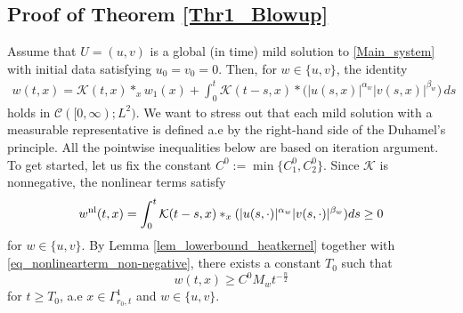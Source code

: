 \documentclass[11pt,reqno]{amsart}
\begin{document}
	\subsection{Proof of Theorem \ref{Thr1_Blowup}}
	Assume that $U=(u,v)$ is a global (in time) mild solution to \eqref{Main_system} with initial data satisfying $u_0=v_0=0$. Then, for $w\in\{u,v\}$, the identity
	\begin{align*}
		w(t,x)=\mathcal{K}(t,x)\ast_xw_1(x)+\int_{0}^{t}\mathcal{K}(t-s,x)*\bigl(|u(s,x)|^{\alpha_w}|v(s,x)|^{\beta_w}\bigr)\,ds 
	\end{align*}
	holds in $\mathcal{C}([0,\infty);L^2)$. We want to stress out that each mild solution with a measurable representative is defined a.e by the right-hand side of the Duhamel's principle. All the pointwise inequalities below are based on iteration argument. To get started, let us fix the constant $C^0:=\min\{C^0_1,C^0_2\}$. Since $\mathcal{K}$ is nonnegative, the nonlinear terms satisfy
	\begin{equation}\label{eq_nonlinearterm_non-negative}
		w^{\rm nl}(t,x)=\int_{0}^t\mathcal{K}(t-s,x)\ast_x(|u(s,\cdot)|^{\alpha_w}|v(s,\cdot)|^{\beta_w})ds\geq 0
	\end{equation}
	for $w\in\{u,v\}$. By Lemma \ref{lem_lowerbound_heatkernel} together with \eqref{eq_nonlinearterm_non-negative}, there exists a constant $T_0$ such that 
	\[
	w(t,x)\geq C^0M_{w}t^{-\frac{n}{2}}
	\]
	for $t\geq T_0$, a.e $x\in\Gamma^1_{r_0,t}$ and $w\in\{u,v\}$.
	
\end{document}
